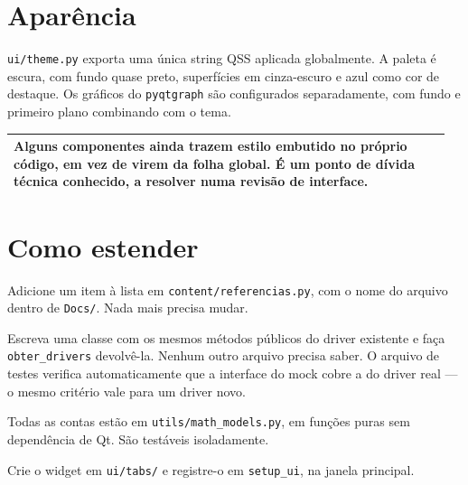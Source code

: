 \documentclass[11pt,a4paper]{article}
\newcommand{\arqv}[1]{\texttt{#1}}
\newenvironment{nota}
  {\par\medskip\noindent\begin{tabular}{|p{0.96\linewidth}|}\hline\rule{0pt}{3ex}}
  {\\[1ex]\hline\end{tabular}\par\medskip}
\begin{document}
\section{Aparência}

\arqv{ui/theme.py} exporta uma única string QSS aplicada globalmente. A paleta é
escura, com fundo quase preto, superfícies em cinza-escuro e azul como cor de
destaque. Os gráficos do \texttt{pyqtgraph} são configurados separadamente, com
fundo e primeiro plano combinando com o tema.

\begin{nota}
Alguns componentes ainda trazem estilo embutido no próprio código, em vez de
virem da folha global. É um ponto de dívida técnica conhecido, a resolver numa
revisão de interface.
\end{nota}

\section{Como estender}

\begin{description}[style=nextline,leftmargin=0.6cm]

  \item[Acrescentar uma referência]
    Adicione um item à lista em \arqv{content/referencias.py}, com o nome do
    arquivo dentro de \texttt{Docs/}. Nada mais precisa mudar.

  \item[Suportar outro instrumento]
    Escreva uma classe com os mesmos métodos públicos do driver existente e
    faça \texttt{obter\_drivers} devolvê-la. Nenhum outro arquivo precisa saber.
    O arquivo de testes verifica automaticamente que a interface do mock cobre
    a do driver real --- o mesmo critério vale para um driver novo.

  \item[Alterar o modelo físico]
    Todas as contas estão em \arqv{utils/math\_models.py}, em funções puras sem
    dependência de Qt. São testáveis isoladamente.

  \item[Acrescentar uma aba]
    Crie o widget em \arqv{ui/tabs/} e registre-o em \texttt{setup\_ui}, na
    janela principal.

\end{description}

\end{document}
